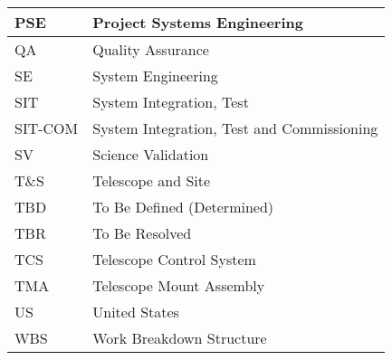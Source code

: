 \begin{longtable}{p{}p{}}
PSE & Project Systems Engineering \\\hline
QA & Quality Assurance \\\hline
SE & System Engineering \\\hline
SIT & System Integration, Test \\\hline
SIT-COM & System Integration, Test and Commissioning \\\hline
SV & Science Validation \\\hline
T\&S & Telescope and Site \\\hline
TBD & To Be Defined (Determined) \\\hline
TBR & To Be Resolved \\\hline
TCS & Telescope Control System \\\hline
TMA & Telescope Mount Assembly \\\hline
US & United States \\\hline
WBS & Work Breakdown Structure \\\hline
\end{longtable}
